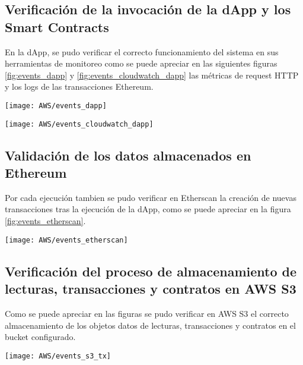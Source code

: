 \subsection{Verificación de la invocación de la dApp y los Smart Contracts}

En la dApp, se pudo verificar el correcto funcionamiento del sistema en sus herramientas de monitoreo como se puede apreciar en las siguientes figuras \ref{fig:events_dapp} y \ref{fig:events_cloudwatch_dapp} las métricas de request HTTP y los logs de las transacciones Ethereum.


\begin{center}
   \texttt{[image: AWS/events\_dapp]}
   \label{fig:events_dapp}
\end{center}

\begin{center}
   \texttt{[image: AWS/events\_cloudwatch\_dapp]}
   \label{fig:events_cloudwatch_dapp}
\end{center}


\subsection{Validación de los datos almacenados en Ethereum}


Por cada ejecución tambien se pudo verificar en Etherscan la creación de nuevas transacciones tras la ejecución de la dApp, como se puede apreciar en la figura \ref{fig:events_etherscan}.

\begin{center}
   \texttt{[image: AWS/events\_etherscan]}
   \label{fig:events_etherscan}
\end{center}


\subsection{Verificación del proceso de almacenamiento de lecturas, transacciones y contratos en AWS S3}

Como se puede apreciar en las figuras se pudo verificar en AWS S3 el correcto almacenamiento de los objetos datos de lecturas, transacciones y contratos en el bucket configurado.

\begin{center}
   \texttt{[image: AWS/events\_s3\_tx]}
   \label{fig:events_s3_tx}
\end{center}


